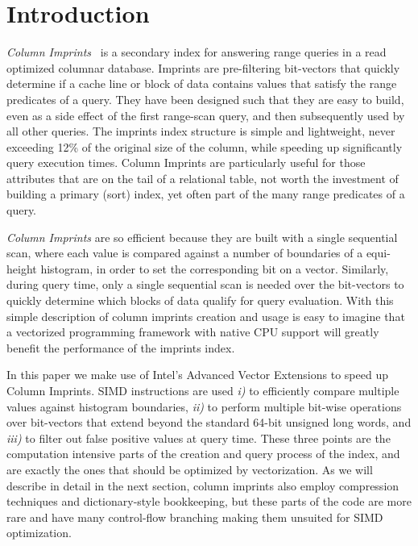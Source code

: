 \documentclass[sigconf]{acmart}
\begin{document}
\section{Introduction}

{\em Column Imprints}~\cite{DBLP:conf/sigmod/SidirourgosK13} is a secondary index
for answering range queries in a read
optimized columnar database. Imprints are pre-filtering bit-vectors that quickly
determine if a cache line or block of data contains values that satisfy the range
predicates of a query. They have been designed such that they are easy to 
build, even as a side effect of the first range-scan query, and then subsequently used by all other queries. The imprints index structure is simple and lightweight, never exceeding 12\% of 
the original size of the column, while speeding up significantly query execution 
times. Column Imprints are particularly useful for those attributes that are on the 
tail of a relational table, not worth the investment of building a primary (sort) 
index, yet often part of the many range predicates of a query.

{\em Column Imprints} are so efficient because they are built with a single 
sequential scan, where each value is compared against a number of boundaries of a equi-height histogram, in order to set the corresponding bit on a vector. Similarly, during query time, only a single sequential scan is needed over the bit-vectors to quickly determine which blocks of data qualify for query evaluation. With this simple description of column imprints creation and usage is 
easy to imagine that a vectorized programming framework with native CPU support 
will greatly benefit the performance of the imprints index.

In this paper we make use of Intel's Advanced Vector Extensions 
\cite{IntelManual2011} to speed up Column Imprints. SIMD instructions are used 
{\em i)} to efficiently compare multiple values against histogram boundaries, {\em ii)} to perform multiple bit-wise operations over bit-vectors that extend beyond the
standard 64-bit unsigned long words, and {\em iii)} to filter out false positive 
values at query time. These three points are the computation intensive parts of the 
creation and query process of the index, and are exactly the ones that should be 
optimized by vectorization. As we will describe in detail in the next section, 
column imprints also employ compression techniques and dictionary-style bookkeeping,
but these parts of the code are more rare and have many control-flow branching 
making them unsuited for SIMD optimization.
\end{document}
